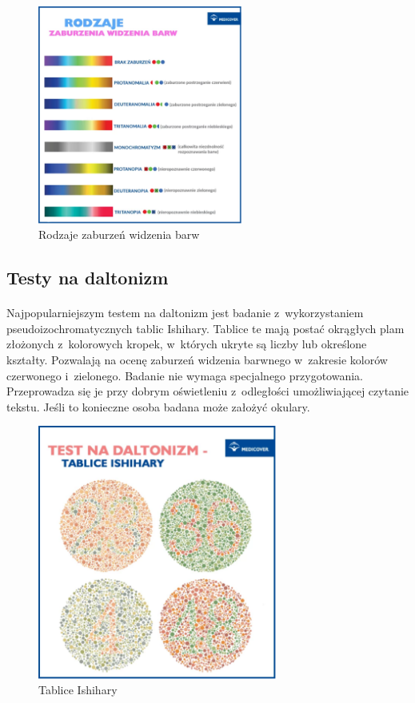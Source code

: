 \documentclass[12pt, letterpaper]{article}
\begin{document}
\begin{figure}[h]
  \centering
      \includegraphics[width=0.6\textwidth]{daltonizm_rodzaje}
  \caption{Rodzaje zaburzeń widzenia barw}
\end{figure}

\newpage

\subsection{Testy na daltonizm}
\paragraph{}
Najpopularniejszym testem na daltonizm jest badanie z~wykorzystaniem pseudoizochromatycznych tablic Ishihary. Tablice te mają postać okrągłych plam złożonych z~kolorowych kropek, w~których ukryte są liczby lub określone kształty. Pozwalają na ocenę zaburzeń widzenia barwnego w~zakresie kolorów czerwonego i~zielonego. Badanie nie wymaga specjalnego przygotowania. Przeprowadza się je przy dobrym oświetleniu z~odległości umożliwiającej czytanie tekstu. Jeśli to konieczne osoba badana może założyć okulary.

\begin{figure}[h]
  \centering
      \includegraphics[width=0.7\textwidth]{ishihara}
  \caption{Tablice Ishihary}
\end{figure}
\end{document}
